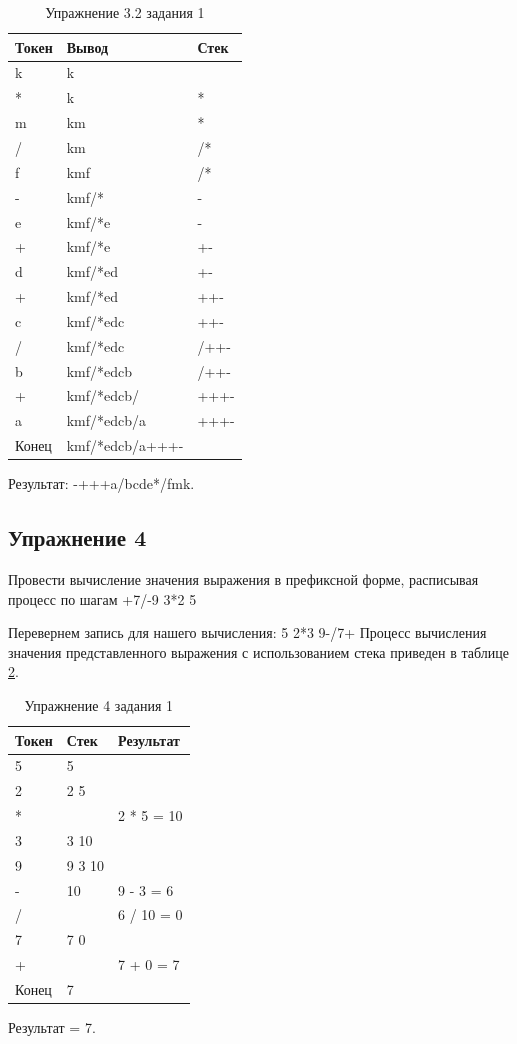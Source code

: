 \documentclass[a4paper, 14pt]{extarticle}
\begin{document}
\begin{longtable}[htpb]{|p{3cm}|p{5cm}|p{3cm}|}
  \caption{Упражнение 3.2 задания 1}
  \label{tab:third2_ex}
  \\
    \hline
    Токен & Вывод & Стек
    \\ \hline
    k & k & 
    \\ \hline
    * & k & *
    \\ \hline
    m & km & *
    \\ \hline
    / & km & /*
    \\ \hline
    f & kmf & /*
    \\ \hline
    - & kmf/* & -
    \\ \hline
    e & kmf/*e & -
    \\ \hline
    + & kmf/*e & +-
    \\ \hline
    d & kmf/*ed & +-
    \\ \hline
    + & kmf/*ed & ++-
    \\ \hline
    c & kmf/*edc & ++-
    \\ \hline
    / & kmf/*edc & /++-
    \\ \hline
    b & kmf/*edcb & /++-
    \\ \hline
    + & kmf/*edcb/ & +++-
    \\ \hline
    a & kmf/*edcb/a & +++-
    \\ \hline
    Конец & kmf/*edcb/a+++- &
    \\ \hline
\end{longtable}
Результат: -+++a/bcde*/fmk.
\subsection{Упражнение 4}
Провести вычисление значения выражения в префиксной форме,
расписывая процесс по шагам
+7/-9 3*2 5

Перевернем запись для нашего вычисления: 5 2*3 9-/7+
Процесс вычисления значения представленного выражения с
использованием стека приведен в таблице \ref{tab:fourth_ex}.
\begin{longtable}[htpb]{|p{3cm}|p{5cm}|p{3cm}|}
  \caption{Упражнение 4 задания 1}
  \label{tab:fourth_ex}
  \\
    \hline
    Токен & Стек & Результат
    \\ \hline
    5 & 5 &
    \\ \hline
    2 & 2 5 &
    \\ \hline
    * & & 2 * 5 = 10
    \\ \hline
    3 & 3 10 &
    \\ \hline
    9 & 9 3 10 & 
    \\ \hline
    - & 10 & 9 - 3 = 6
    \\ \hline
    / &  & 6 / 10 = 0
    \\ \hline
    7 & 7 0 &
    \\ \hline
    + &  & 7 + 0 = 7
    \\ \hline
    Конец & 7 & 
    \\ \hline
\end{longtable}
Результат = 7.
\end{document}
